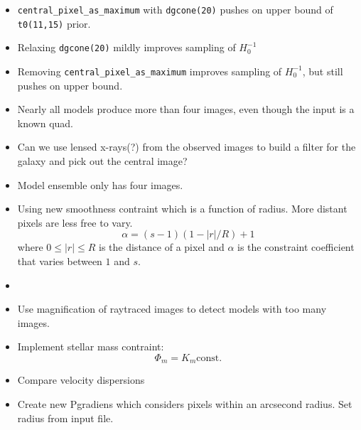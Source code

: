 \documentclass{article}
\begin{document}
\noindent[10-JAN-2011]\bigskip

\begin{itemize}

\item {\tt central\_pixel\_as\_maximum} with {\tt dgcone(20)} pushes on upper bound of {\tt t0(11,15)} prior.
\item Relaxing {\tt dgcone(20)} mildly improves sampling of $H_0^{-1}$
\item Removing {\tt central\_pixel\_as\_maximum} improves sampling of $H_0^{-1}$, but still pushes on upper bound.
\item Nearly all models produce more than four images, even though the input is a known quad.
\item Can we use lensed x-rays(?) from the observed images to build a filter for the galaxy and pick out the central image?
\item Model ensemble only has four images.
\item Using new smoothness contraint which is a function of radius. More distant pixels are less free to vary.
      \[\alpha = (s-1)(1-|r|/R) + 1\] where $0 \le |r| \le R$ is the distance of a pixel and $\alpha$ is the constraint
      coefficient that varies between $1$ and $s$.

\item
\item Use magnification of raytraced images to detect models with too many images.
\item Implement stellar mass contraint:
      \[\Phi_m = K_m \mathrm{const.}\]
\item Compare velocity dispersions
\item Create new Pgradiens which considers pixels within an arcsecond radius. Set radius from input file.

\end{itemize}
\end{document}
